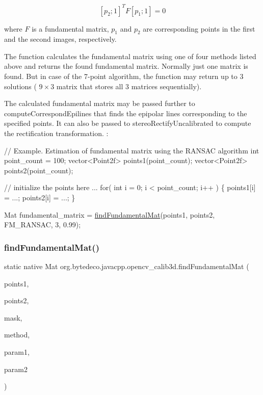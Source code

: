 \[[p_2; 1]^T F [p_1; 1] = 0\] 

where $F$ is a fundamental matrix, $p_1$ and $p_2$ are corresponding points in the first and the second images, respectively. 

The function calculates the fundamental matrix using one of four methods listed above and returns the found fundamental matrix. Normally just one matrix is found. But in case of the 7-\/point algorithm, the function may return up to 3 solutions ( $9 \times 3$ matrix that stores all 3 matrices sequentially). 

The calculated fundamental matrix may be passed further to compute\+Correspond\+Epilines that finds the epipolar lines corresponding to the specified points. It can also be passed to stereo\+Rectify\+Uncalibrated to compute the rectification transformation. \+: 
\begin{DoxyPre}
\begin{DoxyCode}
\textcolor{comment}{// Example. Estimation of fundamental matrix using the RANSAC algorithm}
\textcolor{keywordtype}{int} point\_count = 100;
vector<Point2f> points1(point\_count);
vector<Point2f> points2(point\_count);

\textcolor{comment}{// initialize the points here ...}
\textcolor{keywordflow}{for}( \textcolor{keywordtype}{int} i = 0; i < point\_count; i++ )
\{
    points1[i] = ...;
    points2[i] = ...;
\}

Mat fundamental\_matrix =
 \hyperlink{group__calib3d_gaceb84b17990bba04533d8fe02ab1a1d2}{findFundamentalMat}(points1, points2, FM\_RANSAC, 3, 0.99);
\end{DoxyCode}
 \end{DoxyPre}
 \mbox{\label{group__calib3d_ga1a8446757231db93d44c99331ac4747d}} 
\subsubsection{\texorpdfstring{find\+Fundamental\+Mat()}{findFundamentalMat()}\hspace{0.1cm}{\footnotesize\ttfamily [2/2]}}
{\footnotesize\ttfamily static native Mat org.\+bytedeco.\+javacpp.\+opencv\+\_\+calib3d.\+find\+Fundamental\+Mat (\begin{DoxyParamCaption}\item[{@By\+Val Mat}]{points1,  }\item[{@By\+Val Mat}]{points2,  }\item[{@By\+Val Mat}]{mask,  }\item[{int}]{method,  }\item[{double}]{param1,  }\item[{double}]{param2 }\end{DoxyParamCaption})\hspace{0.3cm}{\ttfamily [static]}}

